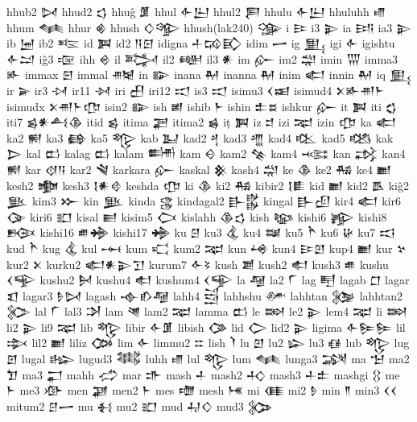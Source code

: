  hhub2  𒄸   
 hhud2  𒌓   
 hhuĝ  𒂠   
 hhul  𒅆𒌨    
 hhul2  𒄾   
 hhulu  𒅆𒌨    
 hhuluhh  𒈛   
 hhum  𒈝   
 hhur  𒄯   
 hhush  𒄭𒄊    
 hhush(lak240)  𒍽   
 i  𒄿   
 i3  𒉌   
 ia  𒅀   
 ia3  𒉌   
 ib  𒅁   
 ib2  𒌈   
 id  𒀉   
 id2  𒀀𒇉    
 idigna  𒈦𒄘𒃼    
 idim  𒅂   
 ig  𒅅   
 igi  𒅆   
 igishtu  𒅆𒁺    
 iĝ3  𒉘   
 ihh  𒄴   
 il  𒅋   
 il2  𒅍   
 il3  𒀭   
 im  𒅎   
 im2  𒁽   
 imin  𒅓   
 imma3  𒅊   
 immax  𒇋   
 immal  𒉥   
 in  𒅔   
 inana  𒈹   
 inanna  𒈹   
 inim  𒅗   
 innin  𒈹   
 iq  𒅅   
 ir  𒅕   
 ir3  𒀴   
 ir11  𒀵   
 iri  𒌷   
 iri12  𒀊   
 is3  𒀊   
 isimu3  𒌋𒀜    
 isimud4  𒉽𒅊𒉣𒈨    
 isimudx  𒉽𒉣𒈨𒂡    
 isin2  𒅔   
 ish  𒅖   
 ishib  𒈨   
 ishin  𒉺𒊺    
 ishkur  𒅎   
 it  𒀉   
 iti  𒌚   
 iti7  𒌗𒀭𒋀𒆠    
 itid  𒌗   
 itima  𒃟   
 itima2  𒌖   
 iṭ  𒀉   
 iz  𒄑   
 izi  𒉈   
 izin  𒂡   
 ka  𒅗   
 ka2  𒆍   
 ka3  𒂵   
 ka5  𒈜   
 kab  𒆏   
 kad2  𒆐   
 kad3  𒆑   
 kad4  𒆒   
 kad5  𒆓   
 kak  𒆕   
 kal  𒆗   
 kalag  𒆗   
 kalam  𒌦   
 kam  𒄰   
 kam2  𒆚   
 kam4  𒆛   
 kan  𒃶   
 kan4  𒆍   
 kar  𒋼𒀀    
 kar2  𒃸   
 karkara  𒅎   
 kaskal  𒆜   
 kash4  𒁽   
 ke  𒆠   
 ke2  𒄀   
 ke4  𒆤   
 kesh2  𒆟   
 kesh3  𒋙𒀭𒄲    
 keshda  𒂡   
 ki  𒆠   
 ki2  𒄀   
 kibir2  𒋙𒀾    
 kid  𒆤   
 kid2  𒋺   
 kiĝ2  𒆥   
 kim3  𒁍   
 kin  𒆥   
 kinda  𒃱   
 kindagal2  𒃲𒌵    
 kingal  𒃲𒌺    
 kir4  𒅗   
 kir6  𒀘   
 kiri6  𒊬   
 kisal  𒆦   
 kisim5  𒆨   
 kislahh  𒆠𒌓    
 kish  𒆧   
 kishi6  𒊾   
 kishi8  𒁞   
 kishi16  𒌑𒄉    
 kishi17  𒄉   
 ku  𒆪   
 ku3  𒆬   
 ku4  𒆭   
 ku5  𒋻   
 ku6  𒄩   
 ku7  𒆯   
 kud  𒋻   
 kug  𒆬   
 kul  𒆰   
 kum  𒄣   
 kum2  𒉈   
 kun  𒆲   
 kun4  𒄿𒇻    
 kup4  𒆤   
 kur  𒆳   
 kur2  𒉽   
 kurku2  𒅗𒀭𒉌𒋛    
 kurum7  𒅆𒂟    
 kush  𒋢   
 kush2  𒊨   
 kush3  𒌑   
 kushu  𒌋𒊊    
 kushu2  𒆵   
 kushu4  𒊨   
 kushum4  𒌋𒊊    
 la  𒆷   
 la2  𒇲   
 lag  𒋃   
 lagab  𒆸   
 lagar  𒇬   
 lagar3  𒊩𒄸    
 lagash  𒉢𒁓𒆷    
 lahh4  𒁻   
 lahhshu  𒇱   
 lahhtan  𒉴   
 lahhtan2  𒉶   
 lal  𒇲   
 lal3  𒋭   
 lam  𒇴   
 lam2  𒉈   
 lamma  𒆗   
 le  𒇷   
 le2  𒉌   
 lem4  𒉈   
 li  𒇷   
 li2  𒉌   
 li9  𒉈   
 lib  𒈜   
 libir  𒅆𒂠    
 libish  𒀚   
 lid  𒀖   
 lid2  𒉌   
 ligima  𒅆𒌉𒌉    
 lil  𒇸   
 lil2  𒆤   
 liliz  𒀗   
 lim  𒅆   
 limmu2  𒇹   
 lish  𒇺   
 lu  𒇻   
 lu2  𒇽   
 lu3  𒈖   
 lub  𒈜   
 lug  𒇻   
 lugal  𒈗   
 lugud3  𒈟   
 luhh  𒈛   
 lul  𒈜   
 lum  𒈝   
 lunga3  𒋋   
 ma  𒈠   
 ma2  𒈣   
 ma3  𒂷   
 mahh  𒈤   
 mar  𒈥   
 mash  𒈦   
 mash2  𒈧   
 mash3  𒈦𒉺    
 mashgi  𒌐   
 me  𒈨   
 me3  𒀞   
 men  𒃞   
 men2  𒈨   
 mes  𒈩   
 mesh  𒎌   
 mi  𒈪   
 mi2  𒊩   
 min  𒈫   
 min3  𒌋𒌋    
 mitum2  𒆪𒅂    
 mu  𒈬   
 mu2  𒊬   
 mud  𒄷𒄭    
 mud3  𒉯   
